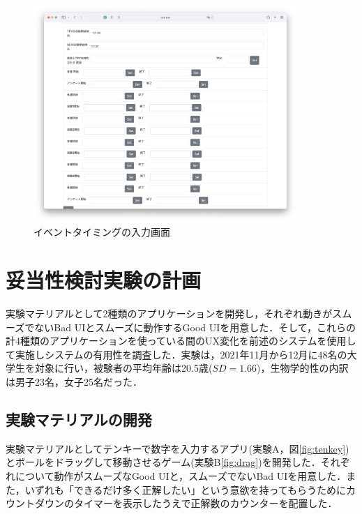 \begin{figure}[htbp]
  \begin{minipage}{\hsize}
    \begin{center}
       \includegraphics[width=100mm]{img/analyzer2}
    \end{center}
    \caption{イベントタイミングの入力画面}
    \label{fig:eventmap2}
  \end{minipage}
\end{figure}

\section{妥当性検討実験の計画}


実験マテリアルとして2種類のアプリケーションを開発し，それぞれ動きがスムーズでないBad UIとスムーズに動作するGood UIを用意した．そして，これらの計4種類のアプリケーションを使っている間のUX変化を前述のシステムを使用して実施しシステムの有用性を調査した．実験は，2021年11月から12月に48名の大学生を対象に行い，被験者の平均年齢は20.5歳($SD=1.66$)，生物学的性の内訳は男子23名，女子25名だった．

\subsection{実験マテリアルの開発}

実験マテリアルとしてテンキーで数字を入力するアプリ(実験A，図\ref{fig:tenkey})とボールをドラッグして移動させるゲーム(実験B\ref{fig:drag})を開発した．それぞれについて動作がスムーズなGood UIと，スムーズでないBad UIを用意した．また，いずれも「できるだけ多く正解したい」という意欲を持ってもらうためにカウントダウンのタイマーを表示したうえで正解数のカウンターを配置した．

